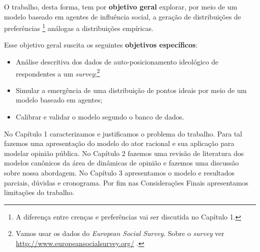 O trabalho, desta forma, tem por \textbf{objetivo geral} explorar, por meio
de um modelo baseado em agentes de influência social, a geração de distribuições
de preferências \footnote{A diferença entre crenças e preferências vai ser
discutida no Capítulo 1.} análogas a distribuições empíricas.

Esse objetivo geral suscita os seguintes \textbf{objetivos específicos}:

\begin{itemize}
\item Análise descritiva dos dados de auto-posicionamento ideológico de
  respondentes a um \textit{survey};\footnote{Vamos usar os dados do
    \textit{European Social Survey}. Sobre o \textit{survey} ver
    \url{http://www.europeansocialsurvey.org/} .}
\item Simular a emergência de uma distribuição de pontos ideais por meio de um
  modelo baseado em agentes; 
\item Calibrar e validar o modelo segundo o banco de dados.
\end{itemize}


No Capítulo 1 caracterizamos e justificamos o problema do trabalho. Para tal
fazemos uma apresentação do modelo do ator racional e sua aplicação para modelar
opinião pública. No Capítulo 2 fazemos uma revisão de literatura dos modelos
canônicos da área de dinâmicas de opinião e fazemos uma discussão sobre nossa
abordagem. No Capítulo 3 apresentamos o modelo e resultados parciais, dúvidas e
cronograma. Por fim nas Considerações Finais apresentamos limitações do trabalho.






